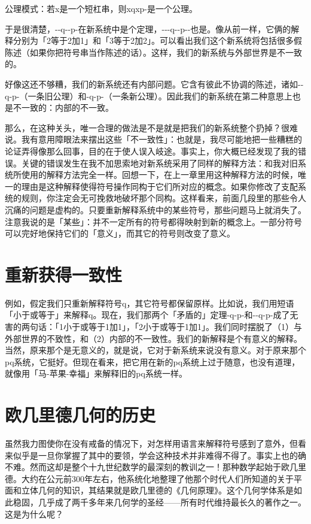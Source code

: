 \documentclass[
  12pt,
  twoside,
  openright,
  oldfontcommands,
]{memoir}
\begin{document}
公理模式：若x是一个短杠串，则xqxp-是一个公理。

于是很清楚，-\/-q-\/-p-在新系统中是个定理，-\/-\/-q-\/-p-\/-也是。像从前一样，它俩的解释分别为「2等于2加1」和「3等于2加2」。可以看出我们这个新系统将包括很多假陈述（如果你把符号串当作陈述的话）。这样，我们的新系统与外部世界是不一致的。

好像这还不够糟，我们的新系统还有内部问题。它含有彼此不协调的陈述，诸如-\/-q-p-（一条旧公理）和-q-p-（一条新公理）。因此我们的新系统在第二种意思上也是不一致的：内部的不一致。

那么，在这种关头，唯一合理的做法是不是就是把我们的新系统整个扔掉？很难说。我有意用障眼法来摆出这些「不一致性」：也就是，我尽可能地把一些糟糕的论证弄得像那么回事，目的在于使人误入岐途。事实上，你大概已经发现了我的错误。关键的错误发生在我不加思索地对新系统采用了同样的解释方法：和我对旧系统所使用的解释方法完全一样。回想一下，在上一章里用这种解释方法的时候，唯一的理由是这种解释使得符号操作同构于它们所对应的概念。如果你修改了支配系统的规则，你注定会无可挽救地破坏那个同构。这样看来，前面几段里的那些令人沉痛的问题是虚构的。只要重新解释系统中的某些符号，那些问题马上就消失了。注意我说的是「某些」：并不一定所有的符号都得映射到新的概念上。一部分符号可以完好地保持它们的「意义」，而其它的符号则改变了意义。

\section{重新获得一致性}

例如，假定我们只重新解释符号q，其它符号都保留原样。比如说，我们用短语「小于或等于」来解释q。现在，我们那两个「矛盾的」定理-q-p-和-\/-q-p-成了无害的两句话：「1小于或等于1加1」，「2小于或等于1加1」。我们同时摆脱了（1）与外部世界的不致性，和（2）内部的不一致性。我们的新解释是个有意义的解释。当然，原来那个是无意义的，就是说，它对于新系统来说没有意义。对于原来那个pq系统，它挺好。但现在看来，把它用在新的pq系统上过于随意，也没有道理，就像用「马-苹果-幸福」来解释旧的pq系统一样。

\section{欧几里德几何的历史}

虽然我力图使你在没有戒备的情况下，对怎样用语言来解释符号感到了意外，但看来似乎是一旦你掌握了其中的要领，学会这种技术并非难得不得了。事实上也的确不难。然而这却是整个十九世纪数学的最深刻的教训之一！那种数学起始于欧几里德。大约在公元前300年左右，他系统化地整理了他那个时代人们所知道的关于平面和立体几何的知识，其结果就是欧几里德的《几何原理》。这个几何学体系是如此稳固，几乎成了两千多年来几何学的圣经------所有时代维持最长久的著作之一。这是为什么呢？
\end{document}

